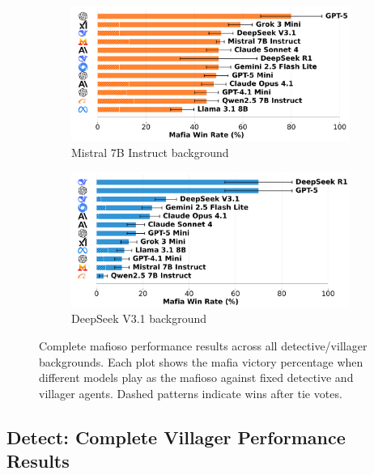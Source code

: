 \documentclass{article}
\begin{document}
\begin{figure}[htbp]
    \begin{subfigure}[b]{0.48\textwidth}
        \centering
        \includegraphics[width=\textwidth]{../results/mafioso_mistral_7b_instruct_db_benchmark.png}
        \caption{Mistral 7B Instruct background}
        \label{fig:mafioso_mistral_appendix}
    \end{subfigure}
    \hfill
    \begin{subfigure}[b]{0.48\textwidth}
        \centering
        \includegraphics[width=\textwidth]{../results/mafioso_deepseek_v3.1_db_benchmark.png}
        \caption{DeepSeek V3.1 background}
        \label{fig:mafioso_deepseek_appendix}
    \end{subfigure}
    \caption{Complete mafioso performance results across all detective/villager backgrounds. Each plot shows the mafia victory percentage when different models play as the mafioso against fixed detective and villager agents. Dashed patterns indicate wins after tie votes.}
    \label{fig:mafioso_complete}
\end{figure}

\subsection{Detect: Complete Villager Performance Results}
\end{document}
